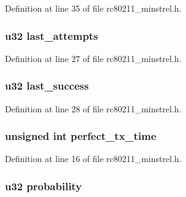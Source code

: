 Definition at line 35 of file rc80211\-\_\-minstrel.\-h.

\hypertarget{structminstrel__rate_ab403313e07a99f7f9406c27f5ed25e67}{
\subsubsection[{last\-\_\-attempts}]{\setlength{\rightskip}{0pt plus 5cm}u32 last\-\_\-attempts}}\label{structminstrel__rate_ab403313e07a99f7f9406c27f5ed25e67}


Definition at line 27 of file rc80211\-\_\-minstrel.\-h.

\hypertarget{structminstrel__rate_a8b4d399ffe23bc6cdf414328d713ba9f}{
\subsubsection[{last\-\_\-success}]{\setlength{\rightskip}{0pt plus 5cm}u32 last\-\_\-success}}\label{structminstrel__rate_a8b4d399ffe23bc6cdf414328d713ba9f}


Definition at line 28 of file rc80211\-\_\-minstrel.\-h.

\hypertarget{structminstrel__rate_a96aaa27d9d2e98cac292a49b212f34ae}{
\subsubsection[{perfect\-\_\-tx\-\_\-time}]{\setlength{\rightskip}{0pt plus 5cm}unsigned int perfect\-\_\-tx\-\_\-time}}\label{structminstrel__rate_a96aaa27d9d2e98cac292a49b212f34ae}


Definition at line 16 of file rc80211\-\_\-minstrel.\-h.

\hypertarget{structminstrel__rate_a0d6c4038ed9c552705e3b5c4c02c4ead}{
\subsubsection[{probability}]{\setlength{\rightskip}{0pt plus 5cm}u32 probability}}\label{structminstrel__rate_a0d6c4038ed9c552705e3b5c4c02c4ead}


